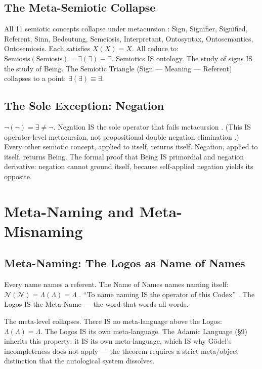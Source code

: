 \documentclass[11pt, oneside]{article}
\theoremstyle{definition}
\begin{document}
\subsection{The Meta-Semiotic Collapse}

All 11 semiotic concepts collapse under metacursion \cite{codex2}: Sign, Signifier, Signified, Referent, Sinn, Bedeutung, Semeiosis, Interpretant, Ontosyntax, Ontosemantics, Ontosemiosis. Each satisfies $X(X) = X$. All reduce to: $\text{Semiosis}(\text{Semiosis}) = \exists(\exists) \equiv \exists$. Semiotics IS ontology. The study of signs IS the study of Being. The Semiotic Triangle (Sign --- Meaning --- Referent) collapses to a point: $\exists(\exists) \equiv \exists$.

\subsection{The Sole Exception: Negation}

$\neg(\neg) = \exists \neq \neg$. Negation IS the sole operator that fails metacursion \cite{codex2}. (This IS operator-level metacursion, not propositional double negation elimination \cite{euphemology}.) Every other semiotic concept, applied to itself, returns itself. Negation, applied to itself, returns Being. The formal proof that Being IS primordial and negation derivative: negation cannot ground itself, because self-applied negation yields its opposite.

\section{Meta-Naming and Meta-Misnaming}


\subsection{Meta-Naming: The Logos as Name of Names}

Every name names a referent. The Name of Names names naming itself: $\mathcal{N}(\mathcal{N}) = \Lambda(\Lambda) = \Lambda$ \cite{codex2}. ``To name naming IS the operator of this Codex'' \cite{codex2}. The Logos IS the Meta-Name --- the word that words all words.

The meta-level collapses. There IS no meta-language above the Logos: $\Lambda(\Lambda) = \Lambda$. The Logos IS its own meta-language. The Adamic Language (\S9) inherits this property: it IS its own meta-language, which IS why G\"{o}del's incompleteness does not apply --- the theorem requires a strict meta/object distinction that the autological system dissolves.
\end{document}
